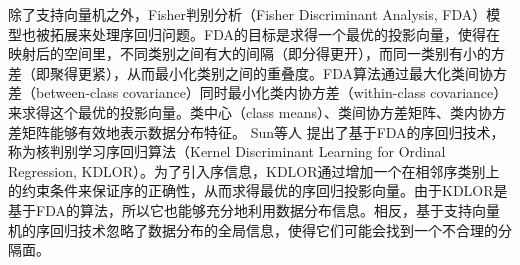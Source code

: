 
除了支持向量机之外，Fisher判别分析（Fisher Discriminant Analysis, FDA\citep{scholkopft1999fisher}）模型也被拓展来处理序回归问题。FDA的目标是求得一个最优的投影向量，使得在映射后的空间里，不同类别之间有大的间隔（即分得更开），而同一类别有小的方差（即聚得更紧），从而最小化类别之间的重叠度。FDA算法通过最大化类间协方差（between-class covariance）同时最小化类内协方差（within-class covariance）来求得这个最优的投影向量。类中心（class means）、类间协方差矩阵、类内协方差矩阵能够有效地表示数据分布特征。
Sun等人\citep{sun2010kernel}
提出了基于FDA的序回归技术，称为核判别学习序回归算法（Kernel Discriminant Learning for Ordinal Regression, KDLOR）。为了引入序信息，KDLOR通过增加一个在相邻序类别上的约束条件来保证序的正确性，从而求得最优的序回归投影向量。由于KDLOR是基于FDA的算法，所以它也能够充分地利用数据分布信息。相反，基于支持向量机的序回归技术忽略了数据分布的全局信息，使得它们可能会找到一个不合理的分隔面\citep{sun2010kernel}。

